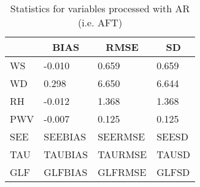 \documentclass[11pt,english]{article}
\begin{document}
\begin{table}[]
\begin{center}
\begin{tabular}{|l|l|l|l|}
\hline
                            & \multicolumn{1}{c|}{\cellcolor[HTML]{C0C0C0}\textbf{BIAS}} & \multicolumn{1}{c|}{\cellcolor[HTML]{C0C0C0}\textbf{RMSE}} & \multicolumn{1}{c|}{\cellcolor[HTML]{C0C0C0}\textbf{SD}} \\\hline
\cellcolor[HTML]{C0C0C0}WS  &    -0.010                                &     0.659                                &     0.659                                \\
\cellcolor[HTML]{C0C0C0}WD  &     0.298                                &     6.650                                &     6.644                                \\
\cellcolor[HTML]{C0C0C0}RH  &    -0.012                                &     1.368                                &     1.368                                \\
\cellcolor[HTML]{C0C0C0}PWV &    -0.007                               &     0.125                               &     0.125                               \\
\cellcolor[HTML]{C0C0C0}SEE & SEEBIAS                               & SEERMSE                               & SEESD                               \\
\cellcolor[HTML]{C0C0C0}TAU & TAUBIAS                               & TAURMSE                               & TAUSD                               \\
\cellcolor[HTML]{C0C0C0}GLF & GLFBIAS                               & GLFRMSE                               & GLFSD                               \\
\hline
\end{tabular}
\caption{Statistics for variables processed with AR (i.e. AFT)}
\end{center}
\end{table}
\clearpage
\end{document}
